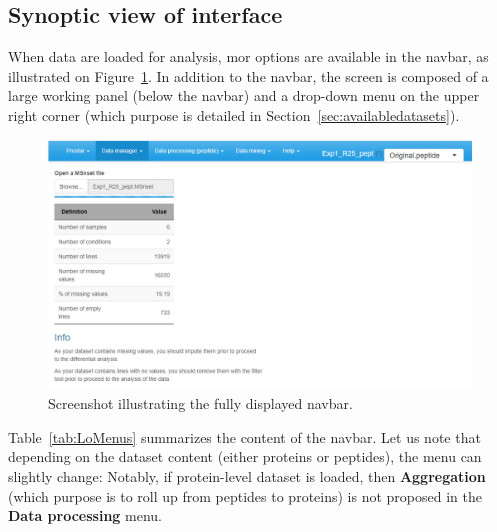\documentclass[12pt]{article}
\begin{document}
\subsection{Synoptic view of  interface}\label{sec:synopsis}

When data are loaded for analysis, mor options are available in the navbar, as illustrated on Figure~\ref{fig:fig2}. In addition to the navbar, the screen is composed of a large working panel (below the navbar) and a drop-down menu on the upper right corner (which purpose is detailed in Section~\ref{sec:availabledatasets}).

\begin{figure}
		\includegraphics[width=1.00\textwidth]{images/load-pep.png}
	\caption{Screenshot illustrating the fully displayed navbar.}
	\label{fig:fig2}
\end{figure}

Table~\ref{tab:LoMenus} summarizes the content of the navbar. Let us note that depending on the dataset content (either proteins or peptides), the menu can slightly change: Notably, if protein-level dataset is loaded, then \textbf{Aggregation} (which purpose is to roll up from peptides to proteins) is not proposed in the \textbf{Data processing} menu.
\end{document}

